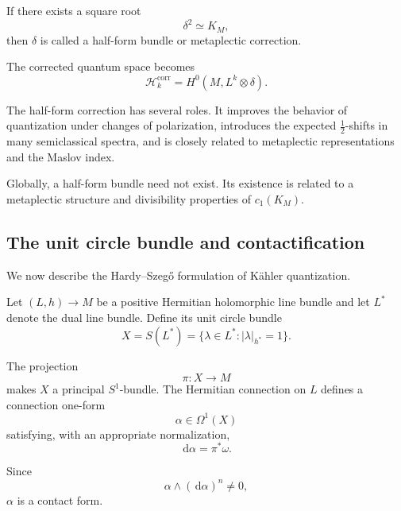 \documentclass[a4paper,11pt]{article}
\theoremstyle{definition}
\newcommand{\dd}{\,\mathrm{d}}
\newcommand{\cH}{\mathcal{H}}
\begin{document}
If there exists a square root
\begin{equation}
    \delta^2
    \simeq
    K_M,
\end{equation}
then $\delta$ is called a half-form bundle or metaplectic correction.

The corrected quantum space becomes
\begin{equation}
    \cH_k^{\mathrm{corr}}
    =
    H^0(M,L^k\otimes\delta).
    \label{eq:gq:corrected_quantization}
\end{equation}

The half-form correction has several roles.  It improves the behavior of
quantization under changes of polarization, introduces the expected
$\frac12$-shifts in many semiclassical spectra, and is closely related to
metaplectic representations and the Maslov index.

Globally, a half-form bundle need not exist.  Its existence is related to a
metaplectic structure and divisibility properties of $c_1(K_M)$.

\subsection{The unit circle bundle and contactification}
\label{app:gq:circlebundle}

We now describe the Hardy--Szeg\H{o} formulation of K\"ahler quantization.

Let $(L,h)\to M$ be a positive Hermitian holomorphic line bundle and let
$L^*$ denote the dual line bundle.  Define its unit circle bundle
\begin{equation}
    X
    =
    S(L^*)
    =
    \{
       \lambda\in L^*:
       |\lambda|_{h^*}=1
    \}.
    \label{eq:gq:circlebundle}
\end{equation}

The projection
\begin{equation}
    \pi:X\rightarrow M
\end{equation}
makes $X$ a principal $S^1$-bundle.  The Hermitian connection on $L$ defines
a connection one-form
\begin{equation}
    \alpha\in\Omega^1(X)
\end{equation}
satisfying, with an appropriate normalization,
\begin{equation}
    \dd\alpha
    =
    \pi^*\omega.
    \label{eq:gq:contact_curvature}
\end{equation}

Since
\begin{equation}
    \alpha\wedge(\dd\alpha)^n
    \neq0,
\end{equation}
$\alpha$ is a contact form.
\end{document}
